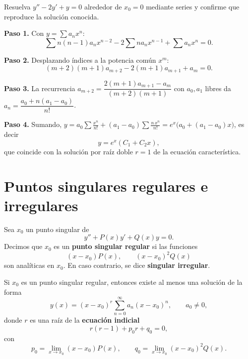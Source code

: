 \begin{example}
  Resuelva $y''-2y'+y=0$ alrededor de $x_0=0$ mediante series y confirme que reproduce la solución conocida.
  \begin{myproof}
    \textbf{Paso 1.} Con $y=\sum a_n x^n$:
    \[
      \sum n(n-1)a_n x^{n-2}-2\sum n a_n x^{n-1}+\sum a_n x^n=0.
    \]

    \textbf{Paso 2.} Desplazando índices a la potencia común $x^m$:
    \[
      (m+2)(m+1)a_{m+2}-2(m+1)a_{m+1}+a_m=0.
    \]

    \textbf{Paso 3.} La recurrencia $a_{m+2}=\dfrac{2(m+1)a_{m+1}-a_m}{(m+2)(m+1)}$ con $a_0,a_1$ libres da $a_n=\dfrac{a_0+n(a_1-a_0)}{n!}$.

    \textbf{Paso 4.} Sumando, $y=a_0\sum \frac{x^n}{n!}+(a_1-a_0)\sum \frac{n\,x^n}{n!}=e^x\big(a_0+(a_1-a_0)x\big)$, es decir
    \[
      \boxed{y=e^x(C_1+C_2 x),}
    \]
    que coincide con la solución por raíz doble $r=1$ de la ecuación característica.
  \end{myproof}
\end{example}

\section{Puntos singulares regulares e irregulares}

\begin{definition}
  Sea $x_0$ un punto singular de
  \[
    y'' + P(x)y' + Q(x)y = 0.
  \]
  Decimos que $x_0$ es un \textbf{punto singular regular} si las funciones
  \[
    (x-x_0)P(x),\qquad (x-x_0)^2 Q(x)
  \]
  son analíticas en $x_0$. En caso contrario, se dice \textbf{singular irregular}.
\end{definition}

\begin{theorem}
\label{thm:cap30:frobenius}
  Si $x_0$ es un punto singular regular, entonces existe al menos una solución de la forma
  \[
    y(x) = (x-x_0)^r \sum_{n=0}^{\infty} a_n (x-x_0)^n,\qquad a_0\neq 0,
  \]
  donde $r$ es una raíz de la \textbf{ecuación indicial}
  \begin{equation}
    r(r-1) + p_0 r + q_0 = 0,
  \end{equation}
  con
  \[
    p_0 = \lim_{x\to x_0} (x-x_0)P(x),\qquad
    q_0 = \lim_{x\to x_0} (x-x_0)^2 Q(x).
  \]
\end{theorem}

